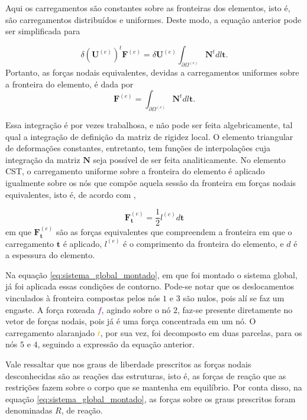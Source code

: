 Aqui os carregamentos são constantes sobre as fronteiras dos elementos, isto é, são carregamentos distribuídos e uniformes. Deste modo, a equação anterior pode ser simplificada para

\begin{equation}
    \delta (\bm{U}^{(e)})^t \bm{F}^{(e)} = \delta \bm{U}^{(e)} \int_{\partial \Omega^{(e)}} \bm{N}^t dl \bm{t}. 
\end{equation}
Portanto, as forças nodais equivalentes, devidas a carregamentos uniformes sobre a fronteira do elemento, é dada por
\begin{equation}
    \bm{F}^{(e)} = \int_{\partial \Omega^{(e)}} \bm{N}^t dl \bm{t}.
\end{equation}

Essa integração é por vezes trabalhosa, e não pode ser feita algebricamente, tal qual a integração de definição da matriz de rigidez local. O elemento triangular de deformações constantes, entretanto, tem funções de interpolações cuja integração da matriz $\bm{N}$ seja possível de ser feita analiticamente. No elemento CST, o carregamento uniforme sobre a fronteira do elemento é aplicado igualmente sobre os nós que compõe aquela sessão da fronteira em forças nodais equivalentes, isto é, de acordo com \cite{Onate},

\begin{equation}
    \bm{F}^{(e)}_{\bm{t}} = \frac{1}{2} l^{(e)} d \bm{t}
\end{equation}
em que $\bm{F}^{(e)}_{\bm{t}}$ são as forças equivalentes que compreendem a fronteira em que o carregamento $\bm{t}$ é aplicado, $l^{(e)}$ é o comprimento da fronteira do elemento, e $d$ é a espessura do elemento.

Na equação \ref{eq:sistema_global_montado}, em que foi montado o sistema global, já foi aplicada essas condições de contorno. Pode-se notar que os deslocamentos vinculados à fronteira compostas pelos nós $1$ e $3$ são nulos, pois alí se faz um engaste. A força roxeada \textcolor{purple}{$f$}, agindo sobre o nó $2$, faz-se presente diretamente no vetor de forças nodais, pois já é uma força concentrada em um nó. O carregamento alaranjado \textcolor{orange}{$t$}, por sua vez, foi decomposto em duas parcelas, para os nós $5$ e $4$, seguindo a expressão da equação anterior. 

Vale ressaltar que nos graus de liberdade prescritos as forças nodais desconhecidas são as reações das estruturas, isto é, as forças de reação que as restrições fazem sobre o corpo que se mantenha em equilíbrio. Por conta disso, na equação \ref{eq:sistema_global_montado}, as forças sobre os graus prescritos foram denominadas $R$, de reação.

